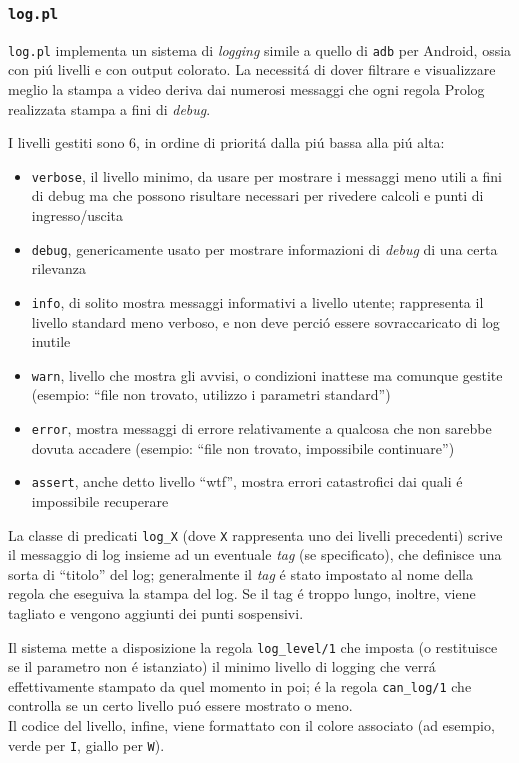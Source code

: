 \documentclass[preprint]{acm_proc_article-sp}
\begin{document}
\subsubsection{\texttt{log.pl}}
\label{prolog-utility-log}
\verb|log.pl| implementa un sistema di \textit{logging} simile a quello di \verb|adb| per Android, ossia con pi\'u livelli e con output colorato. La necessit\'a di dover filtrare e visualizzare meglio la stampa a video deriva dai numerosi messaggi che ogni regola Prolog realizzata stampa a fini di \textit{debug}.

I livelli gestiti sono $6$, in ordine di priorit\'a dalla pi\'u bassa alla pi\'u alta:
\begin{itemize}
\item \verb|verbose|, il livello minimo, da usare per mostrare i messaggi meno utili a fini di debug ma che possono risultare necessari per rivedere calcoli e punti di ingresso/uscita
\item \verb|debug|, genericamente usato per mostrare informazioni di \textit{debug} di una certa rilevanza
\item \verb|info|, di solito mostra messaggi informativi a livello utente; rappresenta il livello standard meno verboso, e non deve perci\'o essere sovraccaricato di log inutile
\item \verb|warn|, livello che mostra gli avvisi, o condizioni inattese ma comunque gestite (esempio: ``file non trovato, utilizzo i parametri standard'')
\item \verb|error|, mostra messaggi di errore relativamente a qualcosa che non sarebbe dovuta accadere (esempio: ``file non trovato, impossibile continuare'')
\item \verb|assert|, anche detto livello ``wtf'', mostra errori catastrofici dai quali \'e impossibile recuperare
\end{itemize}

La classe di predicati \verb|log_X| (dove \verb|X| rappresenta uno dei livelli precedenti) scrive il messaggio di log insieme ad un eventuale \textit{tag} (se specificato), che definisce una sorta di ``titolo'' del log; generalmente il \textit{tag} \'e stato impostato al nome della regola che eseguiva la stampa del log. Se il tag \'e troppo lungo, inoltre, viene tagliato e vengono aggiunti dei punti sospensivi.

Il sistema mette a disposizione la regola \verb|log_level/1| che imposta (o restituisce se il parametro non \'e istanziato) il minimo livello di logging che verr\'a effettivamente stampato da quel momento in poi; \'e la regola \verb|can_log/1| che controlla se un certo livello pu\'o essere mostrato o meno.\\
Il codice del livello, infine, viene formattato con il colore associato (ad esempio, verde per \verb|I|, giallo per \verb|W|).
\end{document}

